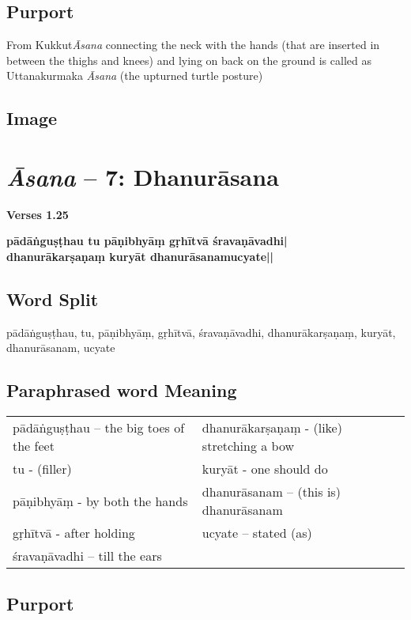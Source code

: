 \subsection*{Purport}

From Kukkut\textit{Āsana} connecting the neck with the hands (that are inserted in between the thighs and knees) and lying on back on the ground is called as Uttanakurmaka \textit{Āsana} (the upturned turtle posture)

\subsection*{Image}
\newpage

\section*{\textit{Āsana} -- 7: Dhanurāsana}

\noindent 
\textbf{Verses 1.25}

\begin{shloka}
\textbf{pādāṅguṣṭhau tu pāṇibhyāṃ gṛhītvā śravaṇāvadhi|}\\
\textbf{dhanurākarṣaṇaṃ kuryāt dhanurāsanamucyate||}
\end{shloka}

\subsection*{Word Split}

pādāṅguṣṭhau, tu, pāṇibhyāṃ, gṛhītvā, śravaṇāvadhi, dhanurā\-karṣa\-ṇaṃ, kuryāt, dhanurāsanam, ucyate

\subsection*{Paraphrased word Meaning}

\begin{longtable}{>{\noindent\raggedright}p{5cm}>{\noindent\raggedright}p{5cm}}
pādāṅguṣṭhau – the big toes of the feet  & dhanurākarṣaṇaṃ - (like) stretching a bow \tabularnewline
tu  - (filler)  & kuryāt  - one should do\tabularnewline
pāṇibhyāṃ - by both the hands  & dhanurāsanam – (this is) dhanurāsanam\tabularnewline
gṛhītvā  - after holding  & ucyate – stated (as)\tabularnewline
śravaṇāvadhi – till the ears & 
\end{longtable}

\subsection*{Purport}

